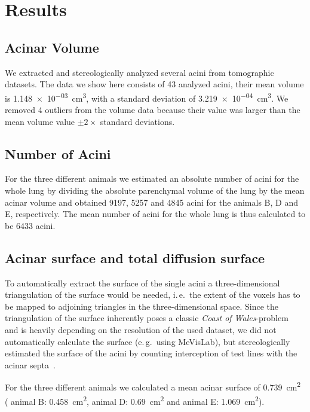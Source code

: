 \documentclass[a4paper,DIVcalc,abstract,english]{scrartcl}
\newcommand{\ie}{i.\,e.\ }
\newcommand{\eg}{e.\,g.\ }
\newcommand{\numberofacini}{43}
\newcommand{\numberofoutliers}{4} %
\newcommand{\biggerthan}{2} %
\newcommand{\totalnumberofaciniB}{9197}
\newcommand{\totalnumberofaciniD}{5257}
\newcommand{\totalnumberofaciniE}{4845}
\newcommand{\meantotalnumberofacini}{6433}
\newcommand{\meanacinarvolume}{1.148e-03} %
\newcommand{\std}{3.219e-04} %
\newcommand{\acinarsurfaceB}{0.458} %
\newcommand{\acinarsurfaceD}{0.69} %
\newcommand{\acinarsurfaceE}{1.069} %
\newcommand{\meanacinarsurface}{0.739} %
\begin{document}
\section{Results}
\label{sec:results}
\subsection{Acinar Volume}
We extracted and stereologically analyzed several acini from tomographic datasets.
The data we show here consists of \numberofacini\xspace analyzed acini, their mean volume is \SI{\meanacinarvolume}{\centi\metre\cubed}, with a standard deviation of \SI{\std}{\centi\metre\cubed}. We removed \numberofoutliers\xspace outliers from the volume data because their value was larger than the mean volume value \(\pm\biggerthan\times\) standard deviations.

\subsection{Number of Acini}
For the three different animals we estimated an absolute number of acini for the whole lung by dividing the absolute parenchymal volume of the lung by the mean acinar volume and obtained \totalnumberofaciniB, \totalnumberofaciniD\xspace and \totalnumberofaciniE\xspace acini for the animals B, D and E, respectively.
The mean number of acini for the whole lung is thus calculated to be \meantotalnumberofacini\xspace acini.

\subsection{Acinar surface and total diffusion surface}
To automatically extract the surface of the single acini a three-dimensional triangulation of the surface would be needed, \ie the extent of the voxels has to be mapped to adjoining triangles in the three-dimensional space.
Since the triangulation of the surface inherently poses a classic \emph{Coast of Wales}-problem~\cite{Mandelbrot1967a} and is heavily depending on the resolution of the used dataset, we did not automatically calculate the surface (\eg using MeVisLab), but stereologically estimated the surface of the acini by counting interception of test lines with the acinar septa~\cite{Hsia2010}.

For the three different animals we calculated a mean acinar surface of \SI{\meanacinarsurface}{\centi\metre\squared} (%
animal B: \SI{\acinarsurfaceB}{\centi\metre\squared},
animal D: \SI{\acinarsurfaceD}{\centi\metre\squared} and
animal E: \SI{\acinarsurfaceE}{\centi\metre\squared}).
\end{document}
